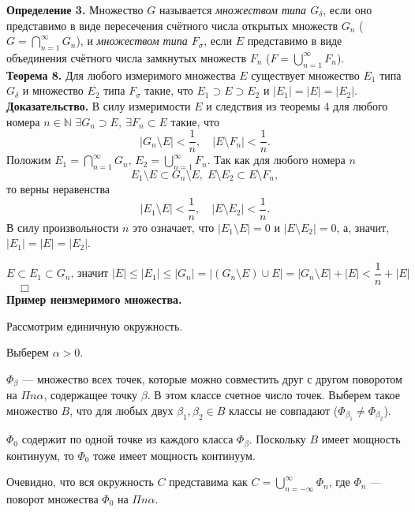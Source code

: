 \documentclass[12pt,a4paper, titlepage]{article}
\begin{document}
\textbf{Определение 3.} Множество $G$ называется \textit{множеством типа $G_\delta$}, если оно представимо в виде пересечения счётного числа открытых множеств $G_n$ ($G = \bigcap\limits_{n=1}^\infty G_n$), и \textit{множеством типа $F_\sigma$}, если $E$ представимо в виде объединения счётного числа замкнутых множеств $F_n$ ($F = \bigcup\limits_{n=1}^\infty F_n$).\\

\textbf{Теорема 8.} 
Для любого измеримого множества $E$ существует множество $E_1$ типа $G_\delta$ и множество $E_2$ типа $F_\sigma$ такие, что $E_1 \supset E \supset E_2$ и $|E_1| = |E| = |E_2|$.\\
\textbf{Доказательство.} В силу измеримости $E$ и следствия из теоремы 4 для любого номера $n \in \mathbb{N}$ $\exists G_n \supset E, \ \exists F_n \subset E$ такие, что
$$
|G_n \setminus E| < \frac 1 n, \quad |E \setminus F_n| < \frac 1 n.
$$
Положим $E_1 = \bigcap\limits_{n=1}^\infty G_n$, $E_2 = \bigcup\limits_{n=1}^\infty F_n$. Так как для любого номера $n$
$$
E_1 \setminus E \subset G_n \setminus E, \; E \setminus E_2 \subset E \setminus F_n,
$$
то верны неравенства
$$
|E_1 \setminus E| < \frac 1 n, \quad |E \setminus E_2| < \frac 1 n.
$$
В силу произвольности $n$ это означает, что $|E_1 \setminus E| = 0$ и $|E \setminus E_2| = 0$, а, значит, $|E_1| = |E| = |E_2|$.

$$E \subset E_1 \subset G_n\text{, значит }|E| \leqslant |E_1| \leqslant|G_n| = |(G_n \setminus E) \cup E| = |G_n \setminus E| + |E| < \frac1n + |E|$$
$\quad \Box$\\


\textbf{Пример неизмеримого множества.}

Рассмотрим единичную окружность.

Выберем $\alpha > 0$.

$\Phi_\beta$ --- множество всех точек, которые можно совместить друг с другом поворотом на $\Pi n \alpha$, содержащее точку $\beta$. В этом классе счетное число точек. Выберем такое множество $B$, что для любых двух $\beta_1, \beta_2 \in B$ классы не совпадают ($\Phi_{\beta_1} \neq \Phi_{\beta_2}$).

$\Phi_0$ содержит по одной точке из каждого класса $\Phi_\beta$. Поскольку $B$ имеет мощность континуум, то $\Phi_0$ тоже имеет мощность континуум.

Очевидно, что вся окружность $C$ представима как $C = \bigcup\limits_{n = -\infty}^\infty \Phi_n$, где $\Phi_n$ --- поворот множества $\Phi_0$ на $\Pi n \alpha$.
\end{document}
